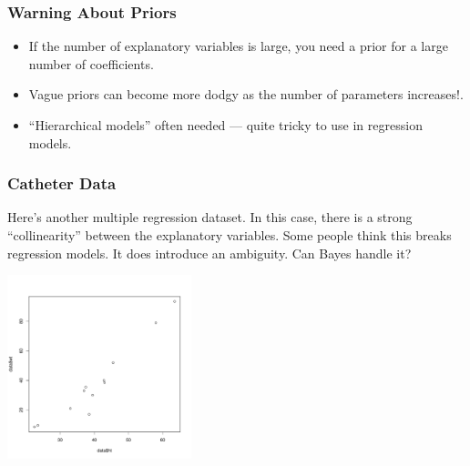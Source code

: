 \documentclass{beamer}
\begin{document}
\begin{frame}
\frametitle{Warning About Priors}
\begin{itemize}
\item If the number of explanatory variables is large, you need a prior
for a large number of coefficients.\pause
\item Vague priors can become more dodgy as the number of
parameters increases!.\pause
\item ``Hierarchical models'' often needed --- quite tricky to use in
regression models.
\end{itemize}

\end{frame}


\begin{frame}
\frametitle{Catheter Data}
Here's another multiple regression dataset. In this case, there is a strong
``collinearity'' between the explanatory variables. Some people think this
breaks regression models. It does introduce an ambiguity.
Can Bayes handle it?

\begin{center}
\includegraphics[width=0.4\textwidth]{images/catheter.pdf}
\end{center}

\end{frame}
\end{document}
